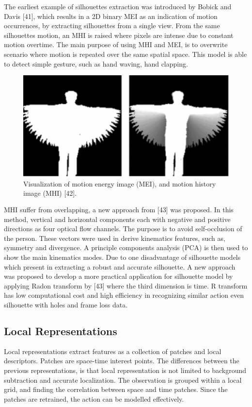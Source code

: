 The earliest example of silhouettes extraction was introduced by Bobick and Davis [41], which results in a 2D binary MEI as an indication of motion occurrences, by extracting silhouettes from a single view. From the same silhouettes motion, an MHI is raised where pixels are intense due to constant motion overtime. The main purpose of using MHI and MEI, is to overwrite scenario where motion is repeated over the same spatial space. This model is able to detect simple gesture, such as hand waving, hand clapping.   
\begin{figure}[ht]
\centering
\includegraphics{Figures/hg}
\decoRule
\caption[Visualization of motion energy image (MEI), and motion history image (MHI) "42"]{Visualization of motion energy image (MEI), and motion history image (MHI) [42].}
\label{fig:la1}
\end{figure}
MHI suffer from overlapping, a new approach from [43] was proposed. In this method, vertical and horizontal components each with negative and positive directions as four optical flow channels. The purpose is to avoid self-occlusion of the person. These vectors were used in derive kinematics features, such as, symmetry and divergence. A principle components analysis (PCA) is then used to show the main kinematics modes. Due to one disadvantage of silhouette models which present in extracting a robust and accurate silhouette. A new approach was proposed to develop a more practical application for silhouette model by applying Radon transform by [43] where the third dimension is time. R transform has low computational cost and high efficiency in recognizing similar action even silhouette with holes and frame loss data. 


\subsection{Local Representations}
\hspace{5mm} Local representations extract features as a collection of patches and local descriptors. Patches are space-time interest points. The differences between the previous representations, is that local representation is not limited to background subtraction and accurate localization. The observation is grouped within a local grid, and finding the correlation between space and time patches. Since the patches are retrained, the action can be modelled effectively.\\

